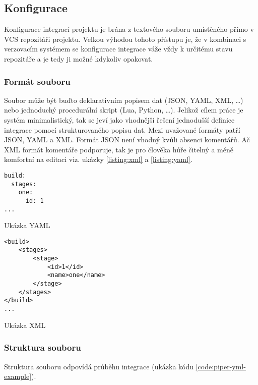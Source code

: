 \subsection{Konfigurace}

Konfigurace integrací projektu je brána z textového souboru umístěného přímo v VCS repozitáři projektu.
Velkou výhodou tohoto přístupu je, že v kombinaci s verzovacím systémem se konfigurace integrace váže vždy k určitému stavu repozitáře a je tedy ji možné kdykoliv opakovat.

\subsubsection{Formát souboru}

Soubor může být buďto deklarativním popisem dat (JSON, YAML, XML, \ldots) nebo jednoduchý procedurální skript (Lua, Python, \ldots).
Jelikož cílem práce je systém minimalistický, tak se jeví jako vhodnější řešení jednodušší definice integrace pomocí strukturovaného popisu dat.
Mezi uvažované formáty patří JSON, YAML a XML.
Formát JSON není vhodný kvůli absenci komentářů.
Ač XML formát komentáře podporuje, tak je pro člověka hůře čitelný a méně komfortní na editaci viz. ukázky \ref{listing:xml} a \ref{listing:yaml}.

\begin{listing}[ht]
\begin{verbatim}
build:
  stages:
    one:
      id: 1
...
\end{verbatim}
\caption{Ukázka YAML}
\label{listing:yaml}
\end{listing}

\begin{listing}[ht]
\begin{verbatim}
<build>
    <stages>
        <stage>
            <id>1</id>
            <name>one</name>
        </stage>
    </stages>
</build>
...
\end{verbatim}
\caption{Ukázka XML}
\label{listing:xml}
\end{listing}

\subsubsection{Struktura souboru}

Struktura souboru odpovídá průběhu integrace (ukázka kódu \ref{code:piper-yml-example}).

